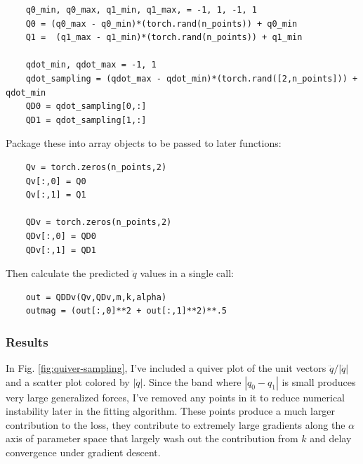 \documentclass[]{article}
\begin{document}
\begin{lstlisting}
	q0_min, q0_max, q1_min, q1_max, = -1, 1, -1, 1
	Q0 = (q0_max - q0_min)*(torch.rand(n_points)) + q0_min
	Q1 =  (q1_max - q1_min)*(torch.rand(n_points)) + q1_min
	
	qdot_min, qdot_max = -1, 1
	qdot_sampling = (qdot_max - qdot_min)*(torch.rand([2,n_points])) + qdot_min
	QD0 = qdot_sampling[0,:]
	QD1 = qdot_sampling[1,:]
\end{lstlisting}

Package these into array objects to be passed to later functions:

\begin{lstlisting}
	Qv = torch.zeros(n_points,2)
	Qv[:,0] = Q0
	Qv[:,1] = Q1
	
	QDv = torch.zeros(n_points,2)
	QDv[:,0] = QD0
	QDv[:,1] = QD1
\end{lstlisting}

Then calculate the predicted $\ddot{q}$  values in a single call:

\begin{lstlisting}
	out = QDDv(Qv,QDv,m,k,alpha)
	outmag = (out[:,0]**2 + out[:,1]**2)**.5
\end{lstlisting}

\subsubsection{Results}
In Fig. \ref{fig:quiver-sampling}, I've included a quiver plot of the unit vectors $\ddot{q}/|\ddot{q}|$ and a scatter plot colored by $|\ddot{q}|$. Since the band where $|q_0-q_1|$ is small produces very large generalized forces, I've removed any points in it to reduce numerical instability later in the fitting algorithm. These points produce a much larger contribution to the loss, they contribute to extremely large gradients along the $\alpha$ axis of parameter space that largely wash out the contribution from $k$ and delay convergence under gradient descent.
\end{document}

